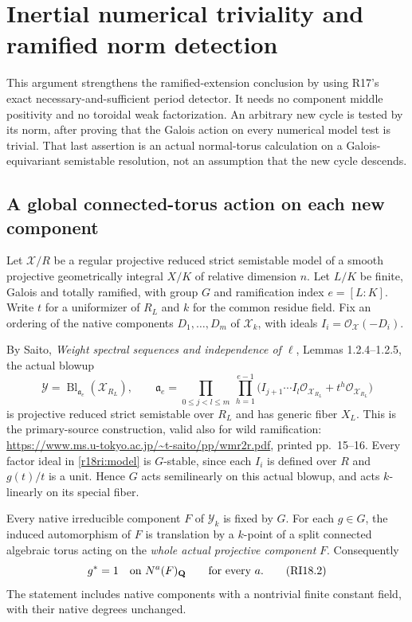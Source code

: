 \section{Inertial numerical triviality and ramified norm detection}
\label{r18ri:section}

This argument strengthens the ramified-extension conclusion by using
R17's exact necessary-and-sufficient period detector.  It needs no
component middle positivity and no toroidal weak factorization.
An arbitrary new cycle is tested by its norm, after proving that the
Galois action on every numerical model test is trivial.  That last
assertion is an actual normal-torus calculation on a Galois-equivariant
semistable resolution, not an assumption that the new cycle descends.

\subsection{A global connected-torus action on each new component}

Let $\mathcal X/R$ be a regular projective reduced strict semistable
model of a smooth projective geometrically integral $X/K$ of relative
dimension $n$.  Let $L/K$ be finite, Galois and totally ramified, with
group $G$ and ramification index $e=[L:K]$.  Write $t$ for a
uniformizer of $R_L$ and $k$ for the common residue field.  Fix an
ordering of the native components $D_1,\ldots,D_m$ of $\mathcal X_k$,
with ideals $I_i=\mathcal O_{\mathcal X}(-D_i)$.

By Saito, \emph{Weight spectral sequences and independence of $\ell$},
Lemmas 1.2.4--1.2.5, the actual blowup
\[
 \mathcal Y=
 \operatorname{Bl}_{\mathfrak a_e}(\mathcal X_{R_L}),\qquad
 \mathfrak a_e=
 \prod_{0\le j<l\le m}\ \prod_{h=1}^{e-1}
 \bigl(I_{j+1}\cdots I_l\mathcal O_{\mathcal X_{R_L}}
                        +t^h\mathcal O_{\mathcal X_{R_L}}\bigr)
 \tag{RI18.1}\label{r18ri:model}
\]
is projective reduced strict semistable over $R_L$ and has generic
fiber $X_L$.  This is the primary-source construction, valid also
for wild ramification:
\url{https://www.ms.u-tokyo.ac.jp/~t-saito/pp/wmr2r.pdf},
printed pp.~15--16.
Every factor ideal in \eqref{r18ri:model} is $G$-stable, since each
$I_i$ is defined over $R$ and $g(t)/t$ is a unit.  Hence $G$ acts
semilinearly on this actual blowup, and acts $k$-linearly on its
special fiber.

\begin{lemma}
\label{r18ri:torus}
Every native irreducible component $F$ of $\mathcal Y_k$ is fixed
by $G$.  For each $g\in G$, the induced automorphism of $F$ is
translation by a $k$-point of a split connected algebraic torus
acting on the \emph{whole actual projective component} $F$.
Consequently
\[
                       g^*=1\quad\hbox{on }N^a(F)_{\mathbf Q}
                         \qquad\hbox{for every }a.
 \tag{RI18.2}\label{r18ri:numerical-triviality}
\]
The statement includes native components with a nontrivial finite
constant field, with their native degrees unchanged.
\end{lemma}

